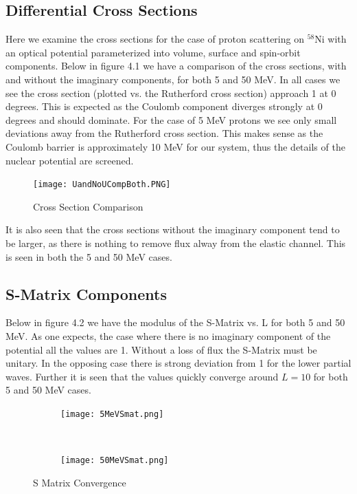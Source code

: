 \documentclass[paper=a4, fontsize=11pt]{scrartcl} %
\numberwithin{equation}{section} %
\numberwithin{figure}{section} %
\numberwithin{table}{section} %
\begin{document}
\subsection{Differential Cross Sections}

Here we examine the cross sections for the case of proton scattering on $^{58}$Ni with an optical potential parameterized into volume, surface and spin-orbit components. Below in figure 4.1 we have a comparison of the cross sections, with and without the imaginary components, for both 5 and 50 MeV. In all cases we see the cross section (plotted vs. the Rutherford cross section) approach 1 at 0 degrees. This is expected as the Coulomb component diverges strongly at 0 degrees and should dominate. For the case of 5 MeV protons we see only small deviations away from the Rutherford cross section.  This makes sense as the Coulomb barrier is approximately 10 MeV for our system, thus the details of the nuclear potential are screened.


\begin{figure}[hbt]
        \centering
	\texttt{[image: UandNoUCompBoth.PNG]}
 \caption{Cross Section Comparison}	
\end{figure}

It is also seen that the cross sections without the imaginary component tend to be larger, as there is nothing to remove flux alway from the elastic channel.  This is seen in both the 5 and 50 MeV cases.

\subsection{S-Matrix Components}
Below in figure 4.2 we have the modulus of the S-Matrix vs. L for both 5 and 50 MeV.  As one expects, the case where there is no imaginary component of the potential all the values are 1.  Without a loss of flux the S-Matrix must be unitary.  In the opposing case there is strong deviation from 1 for the lower partial waves.  Further it is seen that the values quickly converge around $L=10$ for both 5 and 50 MeV cases.

 \begin{figure}[hbt]
        \centering
        \begin{subfigure}[b!]{0.5\textwidth}
                \texttt{[image: 5MeVSmat.png]}
        \end{subfigure}%
        ~ %
\quad
        \begin{subfigure}[b!]{0.5\textwidth}
                \texttt{[image: 50MeVSmat.png]}
        \end{subfigure}

        \caption{S Matrix Convergence}
\end{figure}
\end{document}
